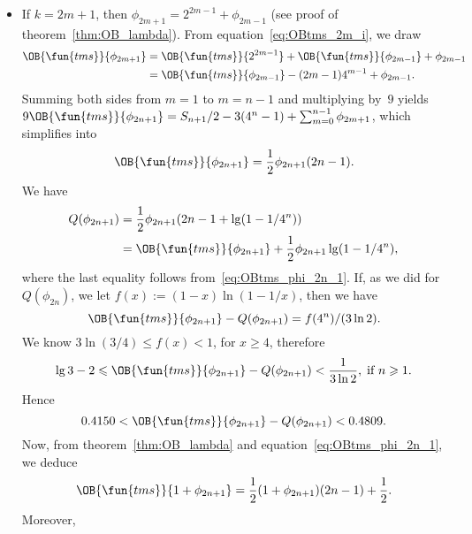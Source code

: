 \begin{itemize}
  \item If \(k=2m+1\), then \(\phi_{2m+1} = 2^{2m-1} + \phi_{2m-1}\)
    (see proof of theorem~\ref{thm:OB_lambda}). From
    equation~\eqref{eq:OBtms_2m_i}, we draw
    \begin{align*}
      \OB{\fun{tms}}{\phi_{2m+1}} &= \OB{\fun{tms}}{2^{2m-1}} +
      \OB{\fun{tms}}{\phi_{2m-1}} + \phi_{2m-1}\\
      &= \OB{\fun{tms}}{\phi_{2m-1}} - (2m-1)4^{m-1} + \phi_{2m-1}.
    \end{align*}
    Summing both sides from \(m=1\) to \(m=n-1\) and multiplying
    by~\(9\) yields \(9\OB{\fun{tms}}{\phi_{2n+1}} = S_{n+1}/2 -
    3(4^n-1) + \sum_{m=0}^{n-1}\phi_{2m+1}\), which simplifies into
    \begin{equation}
      \OB{\fun{tms}}{\phi_{2n+1}} = \frac{1}{2}\phi_{2n+1}(2n - 1).
      \label{eq:OBtms_phi_2n_1}
    \end{equation}
    We have
    \begin{align*}
      Q(\phi_{2n+1}) &= \frac{1}{2}\phi_{2n+1}(2n-1 + \lg(1-1/4^n))\\
      &= \OB{\fun{tms}}{\phi_{2n+1}} + \frac{1}{2}\phi_{2n+1}\lg(1-1/4^n),
    \end{align*}
    where the last equality follows from~\eqref{eq:OBtms_phi_2n_1}.
    If, as we did for \(Q(\phi_{2n})\), we let \(f(x) :=
    (1-x)\ln(1-1/x)\), then we have
    \begin{equation*}
    \OB{\fun{tms}}{\phi_{2n+1}} - Q(\phi_{2n+1}) = f(4^n)/(3\ln 2).
    \end{equation*}
    We know \(3\ln(3/4) \leqslant f(x) < 1\), for \(x \geqslant
    4\), therefore
    \begin{equation*}
      \lg 3 - 2 \leqslant \OB{\fun{tms}}{\phi_{2n+1}} -
      Q(\phi_{2n+1}) < \frac{1}{3\ln 2},\; \text{if \(n \geqslant 1\)}.
    \end{equation*}
    Hence
    \begin{equation}
      0.4150 < \smash{\OB{\fun{tms}}{\phi_{2n+1}}} -
      Q(\phi_{2n+1}) < 0.4809.
      \label{ineq:OBtms_phi_2n_1}
    \end{equation}
    Now, from theorem~\ref{thm:OB_lambda} and
    equation~\eqref{eq:OBtms_phi_2n_1}, we deduce
    \begin{equation}
      \OB{\fun{tms}}{1+\phi_{2n+1}} = \frac{1}{2}(1+\phi_{2n+1})(2n - 1)
      + \frac{1}{2}.
      \label{eq:OBtms_succ_phi_2n_1}
    \end{equation}
    Moreover,
    \begin{align*}

\end{align*}
\end{itemize}
